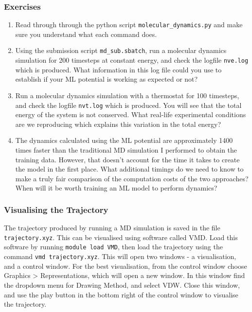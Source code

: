 \documentclass{article}
\begin{document}
\subsubsection*{Exercises}

\begin{enumerate}

\item Read through through the python script \verb|molecular_dynamics.py| and make sure you understand what each command does.
\item Using the submission script \verb|md_sub.sbatch|, run a molecular dynamics simulation for 200 timesteps at constant energy, and check the logfile \verb|nve.log| which is produced. What information in this log file could you use to establish if your ML potential is working as expected or not?
\item Run a molecular dynamics simulation with a thermostat for 100 timesteps, and check the logfile \verb|nvt.log| which is produced. You will see that the total energy of the system is not conserved. What real-life experimental conditions are we reproducing which explains this variation in the total energy?
\item The dynamics calculated using the ML potential are approximately 1400 times faster than the traditional MD simulation I performed to obtain the training data. However, that doesn't account for the time it takes to create the model in the first place. What additional timings do we need to know to make a truly fair comparison of the computation costs of the two approaches? When will it be worth training an ML model to perform dynamics?

\end{enumerate}


\subsubsection*{Visualising the Trajectory}

The trajectory produced by running a MD simulation is saved in the file \verb|trajectory.xyz|. This can be visualised using software called VMD. Load this software by running \verb|module load VMD|, then load the trajectory using the command \verb|vmd trajectory.xyz|. This will open two windows - a visualisation, and a control window. For the best visualisation, from the control window choose Graphics > Representations, which will open a new window. In this window find the dropdown menu for Drawing Method, and select VDW. Close this window, and use the play button in the bottom right of the control window to visualise the trajectory.
\end{document}
